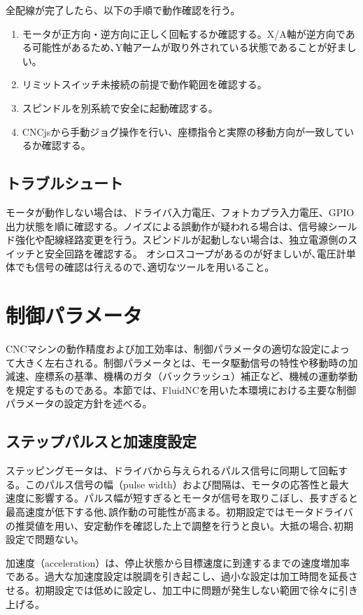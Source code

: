 \documentclass[uplatex,dvipdfmx]{ujarticle}
\begin{document}
全配線が完了したら、以下の手順で動作確認を行う。

\begin{enumerate}
\item モータが正方向・逆方向に正しく回転するか確認する。X/A軸が逆方向である可能性があるため､Y軸アームが取り外されている状態であることが好ましい｡
\item リミットスイッチ未接続の前提で動作範囲を確認する。
\item スピンドルを別系統で安全に起動確認する。
\item CNCjsから手動ジョグ操作を行い、座標指令と実際の移動方向が一致しているか確認する。
\end{enumerate}

\subsection{トラブルシュート}

モータが動作しない場合は、ドライバ入力電圧、フォトカプラ入力電圧、GPIO出力状態を順に確認する。ノイズによる誤動作が疑われる場合は、信号線シールド強化や配線経路変更を行う。スピンドルが起動しない場合は、独立電源側のスイッチと安全回路を確認する。
オシロスコープがあるのが好ましいが､電圧計単体でも信号の確認は行えるので､適切なツールを用いること｡


\section{制御パラメータ}

CNCマシンの動作精度および加工効率は、制御パラメータの適切な設定によって大きく左右される。制御パラメータとは、モータ駆動信号の特性や移動時の加減速、座標系の基準、機構のガタ（バックラッシュ）補正など、機械の運動挙動を規定するものである。本節では、FluidNCを用いた本環境における主要な制御パラメータの設定方針を述べる。

\subsection{ステップパルスと加速度設定}
ステッピングモータは、ドライバから与えられるパルス信号に同期して回転する。このパルス信号の幅（pulse width）および間隔は、モータの応答性と最大速度に影響する。パルス幅が短すぎるとモータが信号を取りこぼし、長すぎると最高速度が低下する他､誤作動の可能性が高まる。初期設定ではモータドライバの推奨値を用い、安定動作を確認した上で調整を行うと良い。大抵の場合､初期設定で問題ない｡

加速度（acceleration）は、停止状態から目標速度に到達するまでの速度増加率である。過大な加速度設定は脱調を引き起こし、過小な設定は加工時間を延長させる。初期設定では低めに設定し、加工中に問題が発生しない範囲で徐々に引き上げる。
\end{document}
